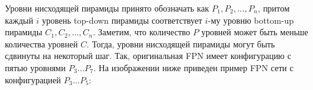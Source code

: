 
Уровни нисходящей пирамиды принято обозначать как $P_1, P_2, ..., P_n$, притом каждый $i$ уровень top-down пирамиды соответствует $i$-му уровню bottom-up пирамиды $C_1, C_2, ..., C_n$. Заметим, что количество $P$ уровней может быть меньше количества уровней $C$. Тогда, уровни нисходящей пирамиды могут быть сдвинуты на некоторый шаг. Так, оригинальная FPN имеет конфигурацию с пятью уровнями $P_3...P_7$. На изображении ниже приведен пример FPN сети с конфигурацией $P_3...P_5$:

